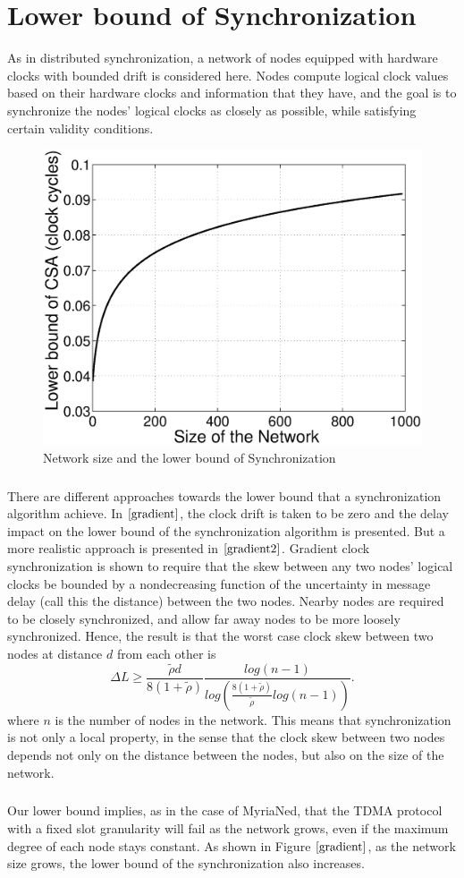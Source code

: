 \documentclass[a4paper,10pt]{report}
\begin{document}
\chapter{\textbf{Lower bound of Synchronization}}
As in distributed synchronization, a network of nodes equipped with hardware clocks with bounded drift is considered
here. Nodes compute logical clock values based on their hardware clocks and information that they have, and the goal is to
synchronize the nodes' logical clocks as closely as possible, while satisfying certain validity conditions.
\begin{figure}[!h]
\centering
\includegraphics[width=0.5 \textwidth]{lowerbound}
\caption{Network size and the lower bound of Synchronization}
\label{gradient}
\end{figure} \paragraph*{}
There are different approaches towards the lower bound that a synchronization algorithm achieve. In $\cite{gradient}$, the clock drift is taken to be zero and the delay impact on the lower bound of the synchronization algorithm is presented. But a more realistic approach is presented in $\cite{gradient2}$. Gradient clock synchronization is shown to require that the skew between any two nodes' logical clocks be
bounded by a nondecreasing function of the uncertainty in message delay (call this the distance) between the two nodes. Nearby nodes
are required to be closely synchronized, and allow far away nodes to be more loosely synchronized. Hence, the result is that the worst
case clock skew between two nodes at distance $d$ from each other is
\begin{equation}
\Delta L \geq \frac{\tilde \rho d}{8(1+\tilde \rho)}\frac{log(n-1)}{log(\frac{8(1+\tilde \rho)}{\tilde \rho}log(n-1))}.
\end{equation}
where $n$ is the number of nodes in the network. This means that synchronization is not only a local property, in the sense that the clock skew between two nodes depends not only on the distance between the nodes, but also on the size of the network. \paragraph*{}
Our lower bound implies, as in the case of MyriaNed, that the TDMA protocol with a fixed slot granularity will fail as the network grows, even if the maximum degree of each node stays constant.
As shown in Figure $\ref{gradient}$, as the network size grows, the lower bound of the synchronization also increases.
\end{document}
